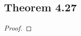 \documentclass[../../main.tex]{subfiles}
\begin{document}
\subsection{Theorem 4.27}
\begin{wts}

\end{wts}
\begin{proof}

\end{proof}
\end{document}
